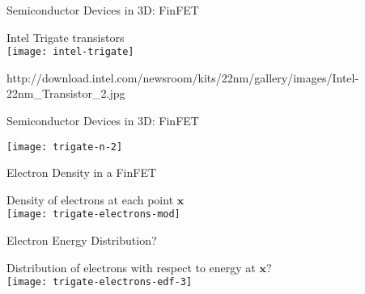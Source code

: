 
\begin{frame} {Semiconductor Devices in 3D: FinFET} 
  
 \begin{center} 
   {\footnotesize Intel Trigate transistors} \\
   \texttt{[image: intel-trigate]}
 \end{center} 
{\tiny http://download.intel.com/newsroom/kits/22nm/gallery/images/Intel-22nm\_Transistor\_2.jpg} \\[.6em]
 
\end{frame} 


\begin{frame} {Semiconductor Devices in 3D: FinFET} 
  
 \begin{center} 
   \texttt{[image: trigate-n-2]}
 \end{center} 
 
\end{frame} 


\begin{frame} {Electron Density in a FinFET} 
  
 \begin{center} 
  Density of electrons at each point $\mathbf x$ \\ 
  \texttt{[image: trigate-electrons-mod]}
 \end{center} 
  \vspace*{2.68cm}
 
\end{frame} 
 

\begin{frame} {Electron Energy Distribution?} 
 \begin{center}Distribution of electrons with respect to energy at $\mathbf{x}$? \\ 
  \texttt{[image: trigate-electrons-edf-3]}
 \end{center} 
\end{frame} 
 

